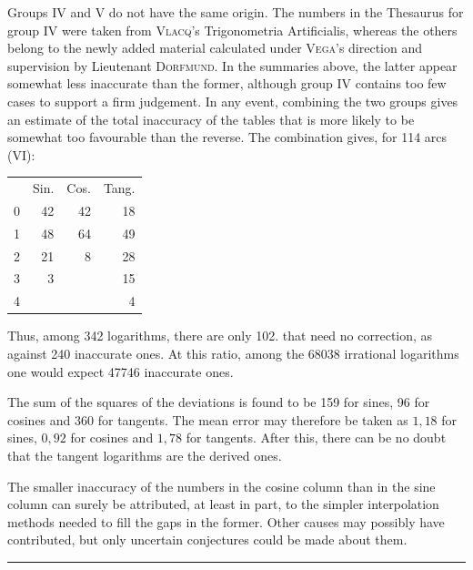 Groups IV and V do not have the same origin. The numbers in the Thesaurus for group IV were taken from \textsc{Vlacq}'s Trigonometria Artificialis, whereas the others belong to the newly added material calculated under \textsc{Vega}'s direction and supervision by Lieutenant \textsc{Dorfmund}. In the summaries above, the latter appear somewhat less inaccurate than the former, although group IV contains too few cases to support a firm judgement. In any event, combining the two groups gives an estimate  of the total inaccuracy of the tables that is more likely to be somewhat too favourable than the reverse. The combination gives, for 114 arcs (VI):
\begin{center}\begin{tabular}{r r r r}
& Sin. & Cos. & Tang.\\
0&42&42&18\\
1&48&64&49\\
2&21&8&28\\
3&3&&15\\
4&&&4
\end{tabular}\end{center}
Thus, among 342 logarithms, there are only 102. that need no correction, as against 240 inaccurate ones. At this ratio, among the 68038 irrational logarithms one would expect 47746 inaccurate ones.

The sum of the squares of the deviations is found to be 159 for sines, 96 for cosines and 360 for tangents. The mean error may therefore be taken as $1{,}18$ for sines, $0{,}92$ for cosines and $1{,}78$ for tangents. After this, there can be no doubt that the tangent logarithms are the derived ones.

\begin{samepage}
The smaller inaccuracy of the numbers in the cosine column than in the sine column can surely be attributed, at least in part, to the simpler interpolation methods needed to fill the gaps in the former. Other causes may possibly have contributed, but only uncertain conjectures could be made about them.
\begin{center}\bigskip\rule{.3\linewidth}{.4pt}\end{center}
\end{samepage}
